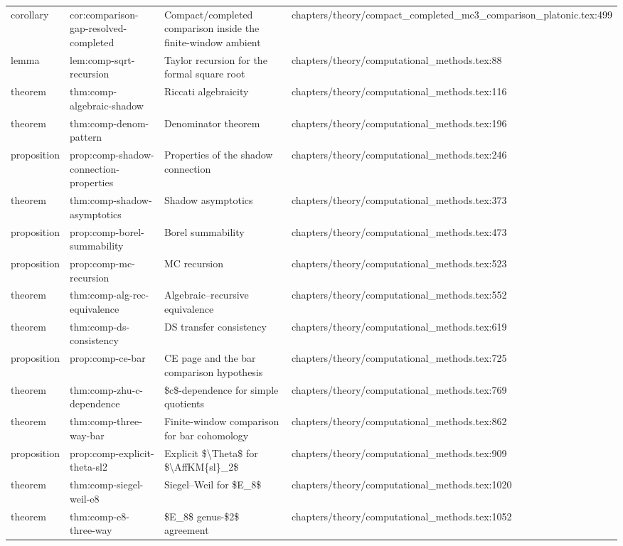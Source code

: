 \documentclass[11pt]{article}
\begin{document}
\begin{longtable}{L{0.10\textwidth}L{0.26\textwidth}L{0.42\textwidth}L{0.22\textwidth}}
corollary & cor:comparison-gap-resolved-completed & Compact/completed comparison inside the finite-window ambient & chapters/theory/compact\_completed\_mc3\_comparison\_platonic.tex:499\\
lemma & lem:comp-sqrt-recursion & Taylor recursion for the formal square root & chapters/theory/computational\_methods.tex:88\\
theorem & thm:comp-algebraic-shadow & Riccati algebraicity & chapters/theory/computational\_methods.tex:116\\
theorem & thm:comp-denom-pattern & Denominator theorem & chapters/theory/computational\_methods.tex:196\\
proposition & prop:comp-shadow-connection-properties & Properties of the shadow connection & chapters/theory/computational\_methods.tex:246\\
theorem & thm:comp-shadow-asymptotics & Shadow asymptotics & chapters/theory/computational\_methods.tex:373\\
proposition & prop:comp-borel-summability & Borel summability & chapters/theory/computational\_methods.tex:473\\
proposition & prop:comp-mc-recursion & MC recursion & chapters/theory/computational\_methods.tex:523\\
theorem & thm:comp-alg-rec-equivalence & Algebraic--recursive equivalence & chapters/theory/computational\_methods.tex:552\\
theorem & thm:comp-ds-consistency & DS transfer consistency & chapters/theory/computational\_methods.tex:619\\
proposition & prop:comp-ce-bar & CE page and the bar comparison hypothesis & chapters/theory/computational\_methods.tex:725\\
theorem & thm:comp-zhu-c-dependence & \$c\$-dependence for simple quotients & chapters/theory/computational\_methods.tex:769\\
theorem & thm:comp-three-way-bar & Finite-window comparison for bar cohomology & chapters/theory/computational\_methods.tex:862\\
proposition & prop:comp-explicit-theta-sl2 & Explicit \$\textbackslash{}Theta\$ for \$\textbackslash{}AffKM\{sl\}\_2\$ & chapters/theory/computational\_methods.tex:909\\
theorem & thm:comp-siegel-weil-e8 & Siegel--Weil for \$E\_8\$ & chapters/theory/computational\_methods.tex:1020\\
theorem & thm:comp-e8-three-way & \$E\_8\$ genus-\$2\$ agreement & chapters/theory/computational\_methods.tex:1052\\

\end{longtable}
\end{document}

